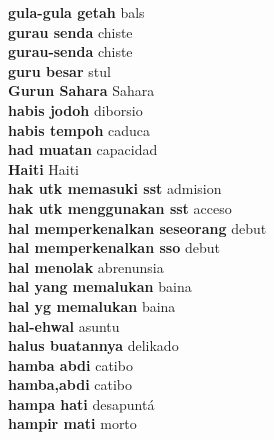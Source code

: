 \textbf{ gula-gula getah  } bals \\
\textbf{ gurau senda  } chiste \\
\textbf{ gurau-senda  } chiste \\
\textbf{ guru besar  } stul \\
\textbf{ Gurun Sahara  } Sahara \\
\textbf{ habis jodoh  } diborsio \\
\textbf{ habis tempoh  } caduca \\
\textbf{ had muatan  } capacidad \\
\textbf{ Haiti  } Haiti \\
\textbf{ hak utk memasuki sst  } admision \\
\textbf{ hak utk menggunakan sst  } acceso \\
\textbf{ hal memperkenalkan seseorang  } debut \\
\textbf{ hal memperkenalkan sso  } debut \\
\textbf{ hal menolak  } abrenunsia \\
\textbf{ hal yang memalukan  } baina \\
\textbf{ hal yg memalukan  } baina \\
\textbf{ hal-ehwal  } asuntu \\
\textbf{ halus buatannya  } delikado \\
\textbf{ hamba abdi  } catibo \\
\textbf{ hamba,abdi  } catibo \\
\textbf{ hampa hati  } desapuntá \\
\textbf{ hampir mati  } morto \\
